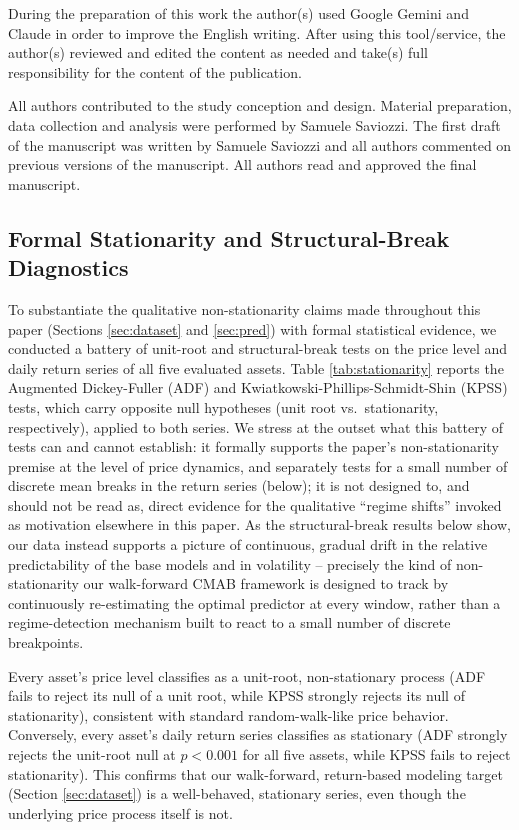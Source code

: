 \documentclass[pdflatex,sn-mathphys-num]{sn-jnl}
\theoremstyle{thmstyleone}%
\theoremstyle{thmstyletwo}%
\theoremstyle{thmstylethree}%
\begin{document}
During the preparation of this work the author(s) used Google Gemini and Claude in order to improve the English writing. After using this tool/service, the author(s) reviewed and edited the content as needed and take(s) full responsibility for the content of the publication.

All authors contributed to the study conception and design. Material preparation, data collection and analysis were performed by Samuele Saviozzi. The first draft of the manuscript was written by Samuele Saviozzi and all authors commented on previous versions of the manuscript. All authors read and approved the final manuscript.


\begin{appendices}

\section{Formal Stationarity and Structural-Break Diagnostics}
\label{sec:stationarity}

To substantiate the qualitative non-stationarity claims made throughout this paper (Sections \ref{sec:dataset} and \ref{sec:pred}) with formal statistical evidence, we conducted a battery of unit-root and structural-break tests on the price level and daily return series of all five evaluated assets. Table \ref{tab:stationarity} reports the Augmented Dickey-Fuller (ADF) \cite{dickey1979distribution} and Kwiatkowski-Phillips-Schmidt-Shin (KPSS) \cite{kwiatkowski1992testing} tests, which carry opposite null hypotheses (unit root vs.\ stationarity, respectively), applied to both series. We stress at the outset what this battery of tests can and cannot establish: it formally supports the paper's non-stationarity premise at the level of price dynamics, and separately tests for a small number of discrete mean breaks in the return series (below); it is not designed to, and should not be read as, direct evidence for the qualitative ``regime shifts'' invoked as motivation elsewhere in this paper. As the structural-break results below show, our data instead supports a picture of continuous, gradual drift in the relative predictability of the base models and in volatility -- precisely the kind of non-stationarity our walk-forward CMAB framework is designed to track by continuously re-estimating the optimal predictor at every window, rather than a regime-detection mechanism built to react to a small number of discrete breakpoints.

Every asset's price level classifies as a unit-root, non-stationary process (ADF fails to reject its null of a unit root, while KPSS strongly rejects its null of stationarity), consistent with standard random-walk-like price behavior. Conversely, every asset's daily return series classifies as stationary (ADF strongly rejects the unit-root null at $p<0.001$ for all five assets, while KPSS fails to reject stationarity). This confirms that our walk-forward, return-based modeling target (Section \ref{sec:dataset}) is a well-behaved, stationary series, even though the underlying price process itself is not.


\end{appendices}
\end{document}
